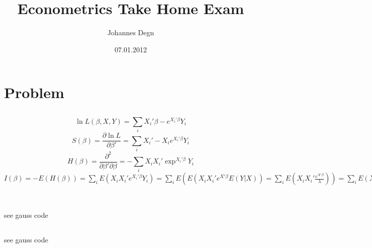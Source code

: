 \documentclass[11pt]{article}
\title{\textbf{Econometrics Take Home Exam}}
\author{Johannes Degn}
\date{07.01.2012}
\theoremstyle{break}
\begin{document}
\maketitle


\section{Problem}
\subsection{}
$$\ln L(\beta, X, Y) = \sum_iX_i'\beta-e^{X_i'\beta}Y_i$$
$$S(\beta) = \frac{\partial\ln L}{\partial \beta'} = \sum_iX_i' - X_ie^{X_i'\beta}Y_i$$
$$H(\beta) = \frac{\partial^2}{\partial \beta' \partial \beta} = -\sum_iX_iX_i'\exp^{X_i'\beta}Y_i$$
$I(\beta) = -E(H(\beta)) = \sum_i E(X_iX_i'e^{X_i'\beta}Y_i) = \sum_i E(E(X_iX_i'e^{X'\beta} E(Y|X)) = \sum_i E(X_iX_i'\frac{e^{X'\beta}}{\lambda})) = \sum_i E(X_iX_i')$ \\
\\
\subsection{}
see gauss code
\subsection{}
see gauss code
\end{document}

